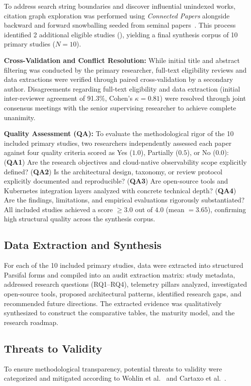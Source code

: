 \documentclass[sigconf, anonymous, balance=false]{acmart}
\begin{document}
To address search string boundaries and discover influential unindexed works, citation graph exploration was performed using \textit{Connected Papers} alongside backward and forward snowballing seeded from seminal papers~\cite{kosinska_2023, usman_2022}. This process identified 2 additional eligible studies (\cite{araujo_24, hartikainen_2024}), yielding a final synthesis corpus of 10 primary studies ($N = 10$).

\textbf{Cross-Validation and Conflict Resolution:} While initial title and abstract filtering was conducted by the primary researcher, full-text eligibility reviews and data extractions were verified through paired cross-validation by a secondary author. Disagreements regarding full-text eligibility and data extraction (initial inter-reviewer agreement of 91.3\%, Cohen's $\kappa = 0.81$) were resolved through joint consensus meetings with the senior supervising researcher to achieve complete unanimity.

\textbf{Quality Assessment (QA):} To evaluate the methodological rigor of the 10 included primary studies, two researchers independently assessed each paper against four quality criteria scored as Yes ($1.0$), Partially ($0.5$), or No ($0.0$): (\textbf{QA1}) Are the research objectives and cloud-native observability scope explicitly defined? (\textbf{QA2}) Is the architectural design, taxonomy, or review protocol explicitly documented and reproducible? (\textbf{QA3}) Are open-source tools and Kubernetes integration layers analyzed with concrete technical depth? (\textbf{QA4}) Are the findings, limitations, and empirical evaluations rigorously substantiated? All included studies achieved a score $\ge 3.0$ out of $4.0$ (mean $= 3.65$), confirming high structural quality across the synthesis corpus.

\subsection{Data Extraction and Synthesis}
For each of the 10 included primary studies, data were extracted into structured Parsifal forms and compiled into an audit extraction matrix: study metadata, addressed research questions (RQ1–RQ4), telemetry pillars analyzed, investigated open-source tools, proposed architectural patterns, identified research gaps, and recommended future directions. The extracted evidence was qualitatively synthesized to construct the comparative tables, the maturity model, and the research roadmap.

\subsection{Threats to Validity}
\label{sec:validity}
To ensure methodological transparency, potential threats to validity were categorized and mitigated according to Wohlin et al.~\cite{wohlin_2012} and Cartaxo et al.~\cite{cartaxo_2018}.
\end{document}
